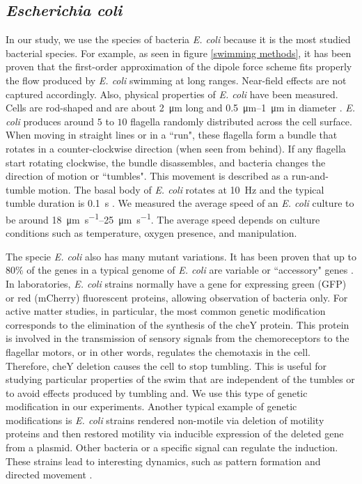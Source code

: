 \subsection{\textit{Escherichia coli}}

In our study, we use the species of bacteria \textit{E. coli} because it is the most studied bacterial species. For example, as seen in figure \ref{swimming methods}, it has been proven that the first-order approximation of the dipole force scheme fits properly the flow produced by  \textit{E. coli} swimming at long ranges\cite{Drescher2011FluidScattering}. Near-field effects are not captured accordingly. Also, physical properties of \textit{E. coli} have been measured. Cells are rod-shaped and are about \SI{2}{\micro\meter} long and \SIrange[range-units=single]{0.5}{1}{\micro\meter} in diameter \cite{BritannicaOnlineEncyclopedia2021EducationEncyclopedia}. \textit{E. coli} produces around $5$ to $10$ flagella randomly distributed across the cell surface. When moving in straight lines or in a ``run", these flagella form a bundle that rotates in a counter-clockwise direction (when seen from behind). If any flagella start rotating clockwise, the bundle disassembles, and bacteria changes the direction of motion or ``tumbles". This movement is described as a run-and-tumble motion. The basal body of \textit{E. coli} rotates at \SI{10}{\hertz} and the typical tumble duration is \SI{0.1}{\second} \cite{Berg2001E.ColiMotion}. We measured the average speed of an \textit{E. coli} culture to be around \SIrange[range-units=single, per-mode = symbol]{18}{25}{\micro\meter \per \second}. The average speed depends on culture conditions such as temperature, oxygen presence, and manipulation. 

The specie \textit{E. coli} also has many mutant variations. It has been proven that up to $80\%$ of the genes in a typical genome of \textit{E. coli} are variable or ``accessory" genes \cite{Lukjancenko2010ComparisonGenomes}. In laboratories, \textit{E. coli} strains normally have a gene for expressing green (GFP) or red (mCherry) fluorescent proteins, allowing observation of bacteria only. For active matter studies, in particular, the most common genetic modification corresponds to the elimination of the synthesis of the cheY protein. This protein is involved in the transmission of sensory signals from the chemoreceptors to the flagellar motors, or in other words, regulates the chemotaxis in the cell. Therefore, cheY deletion causes the cell to stop tumbling. This is useful for studying particular properties of the swim that are independent of the tumbles or to avoid effects produced by tumbling and. We use this type of genetic modification in our experiments. Another typical example of genetic modifications is \textit{E. coli} strains rendered non-motile via deletion of motility proteins and then restored motility via inducible expression of the deleted gene from a plasmid. Other bacteria or a specific signal can regulate the induction. These strains lead to interesting dynamics, such as pattern formation and directed movement \cite{Ravichandar2017TranscriptionalGradient, Curatolo2020CooperativeRegulation}.

